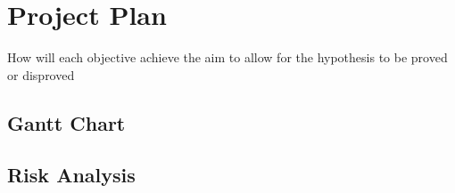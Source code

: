 \chapter{Project Plan}
How will each objective achieve the aim to allow for the hypothesis to be proved or disproved

\section{Gantt Chart}

\section{Risk Analysis}